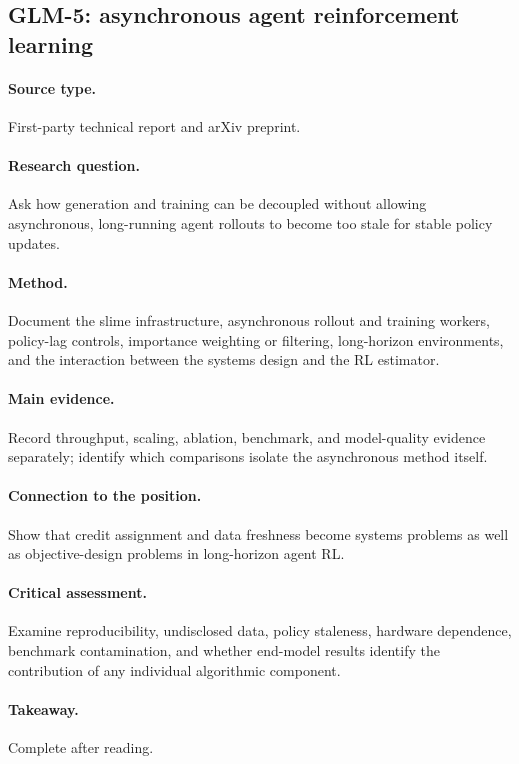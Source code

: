 \subsection{GLM-5: asynchronous agent reinforcement learning
\citep{glm5team2026}}
\paragraph{Source type.} First-party technical report and arXiv preprint.
\paragraph{Research question.} Ask how generation and training can be decoupled without
allowing asynchronous, long-running agent rollouts to become too stale for stable policy updates.
\paragraph{Method.} Document the slime infrastructure, asynchronous rollout and training
workers, policy-lag controls, importance weighting or filtering, long-horizon environments,
and the interaction between the systems design and the RL estimator.
\paragraph{Main evidence.} Record throughput, scaling, ablation, benchmark, and model-quality
evidence separately; identify which comparisons isolate the asynchronous method itself.
\paragraph{Connection to the position.} Show that credit assignment and data freshness
become systems problems as well as objective-design problems in long-horizon agent RL.
\paragraph{Critical assessment.} Examine reproducibility, undisclosed data, policy staleness,
hardware dependence, benchmark contamination, and whether end-model results identify the
contribution of any individual algorithmic component.
\paragraph{Takeaway.} Complete after reading.
